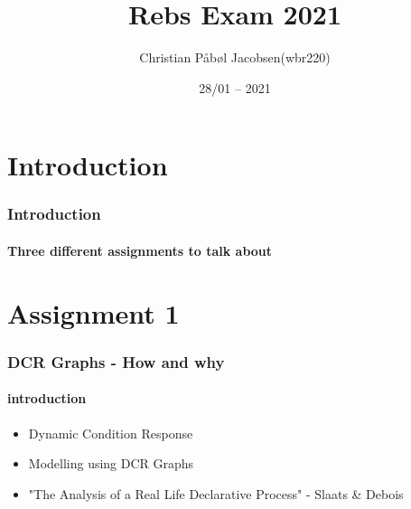 \documentclass{beamer}
\title[Exam]{Rebs Exam 2021}
\author[Christian]{Christian Påbøl Jacobsen(wbr220)}
\date{28/01 -- 2021}
\institute[DIKU]{University of Copenhagen -- DIKU}
\begin{document}
    \frame{\titlepage}%
    \section{Introduction}

    \begin{frame}
      \frametitle{Introduction}
      \framesubtitle{Three different assignments to talk about}
      \tableofcontents
    \end{frame}

    \section{Assignment 1}
    \begin{frame}[t]
        \frametitle{DCR Graphs - How and why}
        \framesubtitle{introduction}
        \begin{itemize}
            \item Dynamic Condition Response\\ 
            \item Modelling using DCR Graphs\\
            \item "The Analysis of a Real Life Declarative Process" 
                - Slaats \& Debois\\
        \end{itemize}
    \end{frame}
\end{document}
